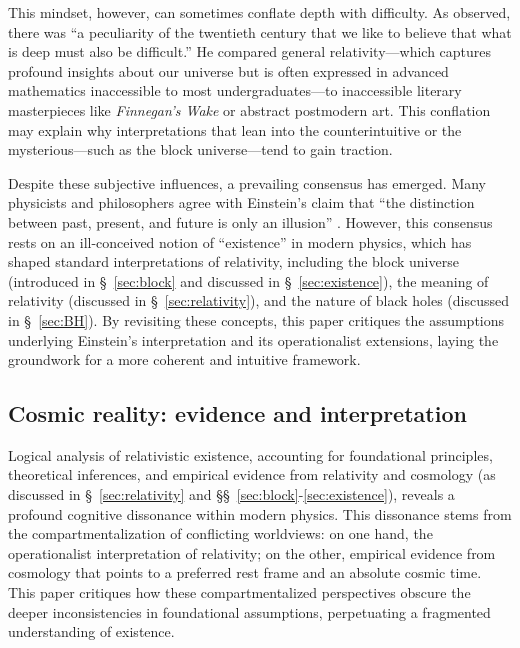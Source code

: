 \documentclass[aps,rmp,groupedaddress,twocolumn,10pt]{revtex4-2}
\begin{document}
This mindset, however, can sometimes conflate depth with difficulty. As \cite{Smolin1997} observed, there was ``a peculiarity of the twentieth century that we like to believe that what is deep must also be difficult.'' He compared general relativity---which captures profound insights about our universe but is often expressed in advanced mathematics inaccessible to most undergraduates---to inaccessible literary masterpieces like \textit{Finnegan's Wake} or abstract postmodern art. This conflation may explain why interpretations that lean into the counterintuitive or the mysterious---such as the block universe---tend to gain traction.

Despite these subjective influences, a prevailing consensus has emerged. Many physicists \cite{barbour2001,davies2002,Greene2004,rovelli2019} and philosophers \cite{callender2017} agree with Einstein’s claim that ``the distinction between past, present, and future is only an illusion'' \cite{Schilpp1959}. However, this consensus rests on an ill-conceived notion of ``existence'' in modern physics, which has shaped standard interpretations of relativity, including the block universe (introduced in \S~\ref{sec:block} and discussed in \S~\ref{sec:existence}), the meaning of relativity (discussed in \S~\ref{sec:relativity}), and the nature of black holes (discussed in \S~\ref{sec:BH}). By revisiting these concepts, this paper critiques the assumptions underlying Einstein’s interpretation and its operationalist extensions, laying the groundwork for a more coherent and intuitive framework.

\subsection{Cosmic reality: evidence and interpretation}

Logical analysis of relativistic existence, accounting for foundational principles, theoretical inferences, and empirical evidence from relativity and cosmology (as discussed in \S~\ref{sec:relativity} and \S\S~\ref{sec:block}-\ref{sec:existence}), reveals a profound cognitive dissonance within modern physics. This dissonance stems from the compartmentalization of conflicting worldviews: on one hand, the operationalist interpretation of relativity; on the other, empirical evidence from cosmology that points to a preferred rest frame and an absolute cosmic time. This paper critiques how these compartmentalized perspectives obscure the deeper inconsistencies in foundational assumptions, perpetuating a fragmented understanding of existence.
\end{document}
